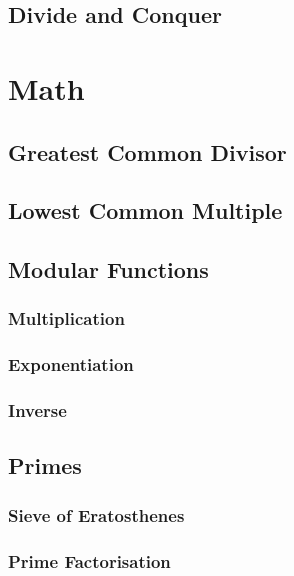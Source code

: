 \documentclass{article}
\begin{document}

\subsection{Divide and Conquer}


\section{Math}
\subsection{Greatest Common Divisor}

\subsection{Lowest Common Multiple}


\subsection{Modular Functions}
\subsubsection{Multiplication}

\subsubsection{Exponentiation}

\subsubsection{Inverse}


\subsection{Primes}
\subsubsection{Sieve of Eratosthenes}

\subsubsection{Prime Factorisation}

\end{document}
